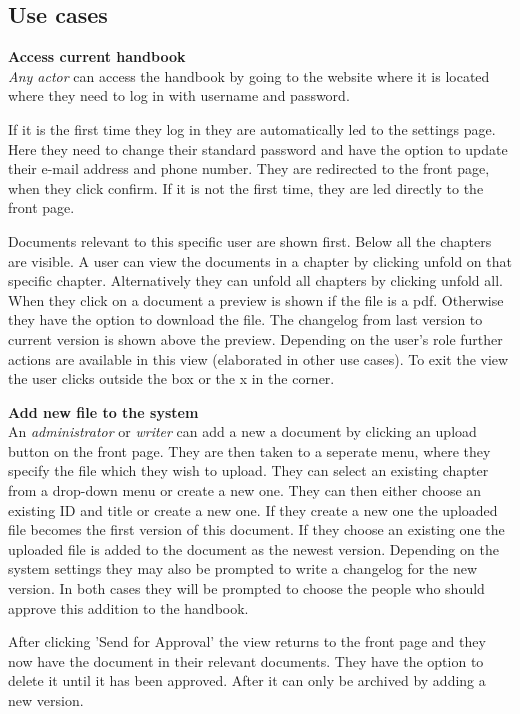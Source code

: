\subsection{Use cases} \label{sec:usecases}

\textbf{Access current handbook}
\\
\textit{Any actor} can access the handbook by going to the website where it is located where they need to log in with username and password.

If it is the first time they log in they are automatically led to the settings page.
Here they need to change their standard password and have the option to update their e-mail address and phone number.
They are redirected to the front page, when they click confirm.
If it is not the first time, they are led directly to the front page.

Documents relevant to this specific user are shown first.
Below all the chapters are visible.
A user can view the documents in a chapter by clicking unfold on that specific chapter.
Alternatively they can unfold all chapters by clicking unfold all.
When they click on a document a preview is shown if the file is a pdf.
Otherwise they have the option to download the file.
The changelog from last version to current version is shown above the preview.
Depending on the user's role further actions are available in this view (elaborated in other use cases).
To exit the view the user clicks outside the box or the x in the corner.


\textbf{Add new file to the system}
\\
An \textit{administrator} or \textit{writer} can add a new a document by clicking an upload button on the front page.
They are then taken to a seperate menu, where they specify the file which they wish to upload.
They can select an existing chapter from a drop-down menu or create a new one. 
They can then either choose an existing ID and title or create a new one.
If they create a new one the uploaded file becomes the first version of this document.
If they choose an existing one the uploaded file is added to the document as the newest version.
Depending on the system settings they may also be prompted to write a changelog for the new version.
In both cases they will be prompted to choose the people who should approve this addition to the handbook.

After clicking 'Send for Approval' the view returns to the front page and they now have the document in their relevant documents.
They have the option to delete it until it has been approved.
After it can only be archived by adding a new version.

